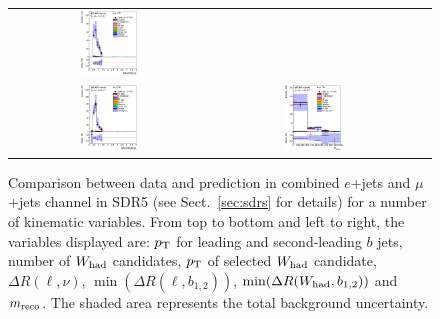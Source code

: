 \begin{figure}[htbp]
\begin{center}
\begin{tabular}{ccc}
\includegraphics[width=0.30\textwidth]{appendices/figures/sdrs/VLQAna_WbX_MinDRlb_ELEMUONCR4_1W_NOMINAL.eps} \\
\includegraphics[width=0.30\textwidth]{appendices/figures/sdrs/VLQAna_WbX_MinDRWb_ELEMUONCR4_1W_NOMINAL.eps} &
\includegraphics[width=0.30\textwidth]{appendices/figures/sdrs/VLQAna_WbX_1W_MWb_4_ELEMUONCR4_1W_NOMINAL.eps} & \\
\end{tabular}\caption{\small {Comparison between data and prediction in combined $e$+jets and $\mu$+jets channel in SDR5 (see Sect.~\ref{sec:sdrs} for details) 
for a number of kinematic variables. From top to bottom and left to right, the variables displayed are: $\pt$ for leading and second-leading $b$ jets,
number of $W_{\rm had}$  candidates, $\pt$ of selected $W_{\rm had}$  candidate, $\Delta R(\ell,\nu)$, $\min(\Delta R(\ell, b_{1,2}))$, 
$\min(\Delta R(W_{\rm had}, b_{1,2}))$ and $m_{\rm reco}$.
The shaded area represents the total background uncertainty.}}
\label{fig:ELEMUONCR4_3}
\end{center}
\end{figure}                                                                             
